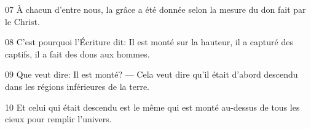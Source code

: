 
07 À chacun d’entre nous, la grâce a été donnée selon la mesure du don fait par le Christ.

08 C’est pourquoi l’Écriture dit: Il est monté sur la hauteur, il a capturé des captifs, il a fait des dons aux hommes.

09 Que veut dire: Il est monté? --- Cela veut dire qu’il était d’abord descendu dans les régions inférieures de la terre.

10 Et celui qui était descendu est le même qui est monté au-dessus de tous les cieux pour remplir l’univers.
